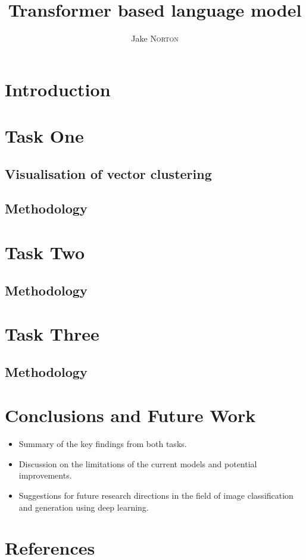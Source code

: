 \documentclass[12pt]{article}
\title{Transformer based language model}
\author{Jake \textsc{Norton}}
\begin{document}
\maketitle

\section{Introduction}

\section{Task One}
\subsection{Visualisation of vector clustering}
\subsection{Methodology}
\section{Task Two}
\subsection{Methodology}
\section{Task Three}
\subsection{Methodology}


\section{Conclusions and Future Work}
\begin{itemize}
	\item Summary of the key findings from both tasks.
	\item Discussion on the limitations of the current models and potential improvements.
	\item Suggestions for future research directions in the field of image classification and generation using deep learning.
\end{itemize}

\section{References}
\end{document}
